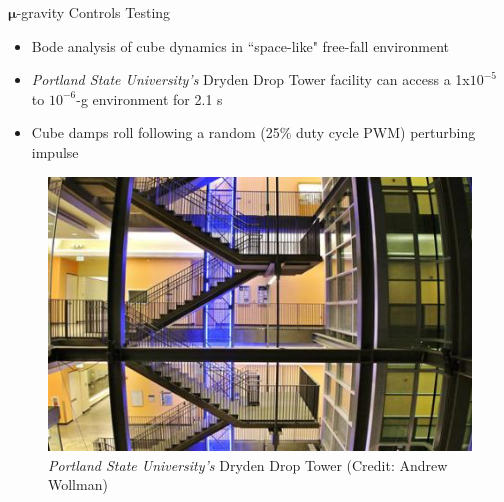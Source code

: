 \documentclass[slidestop,compress]{beamer}
\begin{document}
\begin{frame}[plain]
\begin{block}{\centering $\pmb \mu$-gravity Controls Testing}
\hspace{1 mm}
\begin{itemize}
\item Bode analysis of cube dynamics in ``space-like" free-fall environment
\item {\it Portland State University's} Dryden Drop Tower facility can access a 1x$10^{-5}$ to $10^{-6}$-g environment for 2.1 s
\item Cube damps roll following a random (25\% duty cycle PWM) perturbing impulse\\
\end{itemize}
\begin{figure}[!ht]
\centering
{\includegraphics[width=0.9\linewidth]{MCHS-NASA-2016_03.jpg}
\caption{{\it Portland State University's} Dryden Drop Tower (Credit: Andrew Wollman)}
} 
\end{figure}

\end{block}    
\end{frame}
\end{document}
